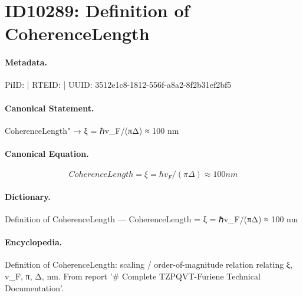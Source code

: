 \section*{ID10289: Definition of CoherenceLength}
\paragraph{Metadata.}
PiID:  | RTEID:  | UUID: 3512e1c8-1812-556f-a8a2-8f2b31ef2bf5

\paragraph{Canonical Statement.}
CoherenceLength" → ξ = ℏv\_F/(πΔ) ≈ 100 nm

\paragraph{Canonical Equation.}
\[
CoherenceLength = ξ = ℏv_F/(πΔ) ≈ 100 nm
\]

\paragraph{Dictionary.}
Definition of CoherenceLength — CoherenceLength = ξ = ℏv\_F/(πΔ) ≈ 100 nm

\paragraph{Encyclopedia.}
Definition of CoherenceLength: scaling / order-of-magnitude relation relating ξ, v\_F, π, Δ, nm. From report '\# Complete TZPQVT-Furiene Technical Documentation'.
